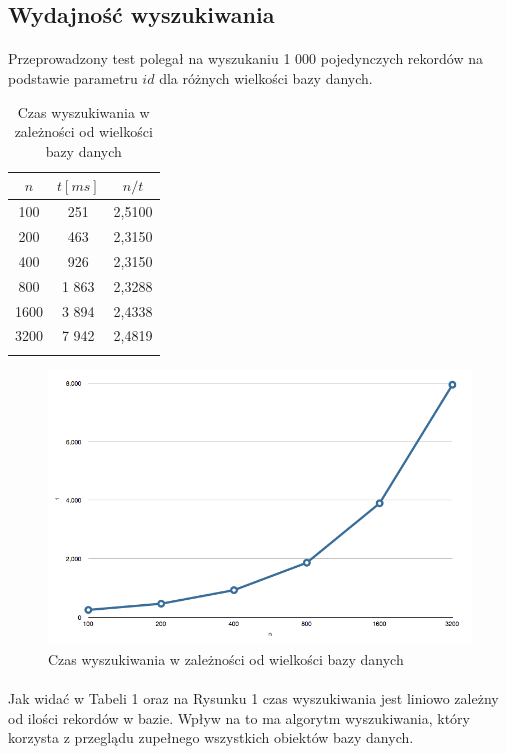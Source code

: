 \documentclass[wide,a4paper,titlepage,12pt] {article}
\begin{document}
  \subsection{Wydajność wyszukiwania}
  \paragraph{}
  Przeprowadzony test polegał na wyszukaniu 1 000 pojedynczych rekordów na podstawie parametru $id$ dla różnych wielkości bazy danych.


  \begin{longtable}{|c|c|c|}
    \hline
    $n$ &	$t [ms]$	& $n/t$ \\
    \hline
    100	& 251	  & 2,5100 \\
    200	& 463	  & 2,3150 \\
    400	& 926	  & 2,3150 \\
    800	& 1 863	& 2,3288 \\
    1600 & 3 894 & 2,4338 \\
    3200 & 7 942 & 2,4819 \\
    \hline
    \caption{Czas wyszukiwania w zależności od wielkości bazy danych}
  \end{longtable}

  \begin{figure}[H]
    \begin{center}
      \includegraphics[width=\textwidth]{1.png}
      \caption{Czas wyszukiwania w zależności od wielkości bazy danych}
    \end{center}
  \end{figure}

  \paragraph{}
  Jak widać w Tabeli 1 oraz na Rysunku 1 czas wyszukiwania jest liniowo zależny od ilości rekordów w bazie. Wpływ na to ma algorytm wyszukiwania, który korzysta z przeglądu zupełnego wszystkich obiektów bazy danych.
\end{document}
